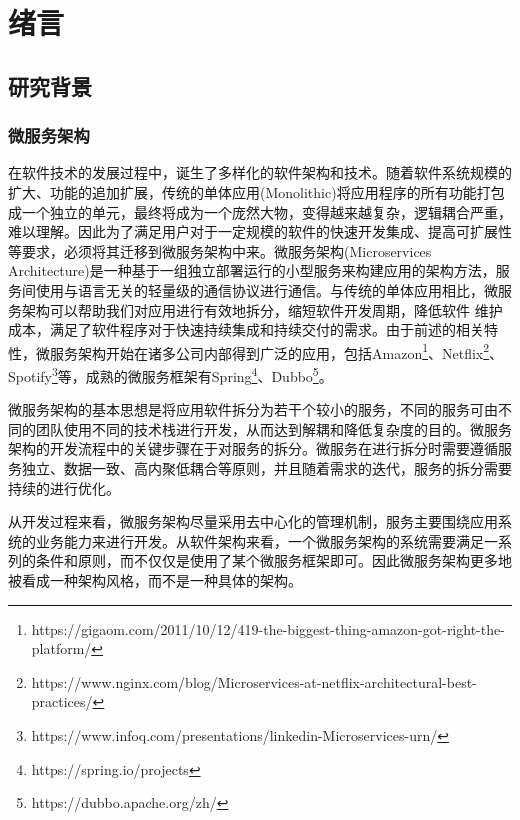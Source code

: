 \documentclass[macfonts,master]{njuthesis}
\begin{document}
\chapter{绪言}\label{chapter_introduction}

\section{研究背景}
\subsection{微服务架构}
在软件技术的发展过程中，诞生了多样化的软件架构和技术。随着软件系统规模的扩大、功能的追加扩展，传统的单体应用(Monolithic)将应用程序的所有功能打包成一个独立的单元，最终将成为一个庞然大物，变得越来越复杂，逻辑耦合严重，难以理解。因此为了满足用户对于一定规模的软件的快速开发集成、提高可扩展性等要求，必须将其迁移到微服务架构中来\cite{bucchiarone2018monolithic,taibi2017processes,al2018comparative,马晓星2019软件开发方法发展回顾与展望}。微服务架构(Microservices Architecture)是一种基于一组独立部署运行的小型服务来构建应用的架构方法，服务间使用与语言无关的轻量级的通信协议进行通信\cite{Microservices,dragoni2017microservices}。与传统的单体应用相比，微服务架构可以帮助我们对应用进行有效地拆分，缩短软件开发周期，降低软件 维护成本，满足了软件程序对于快速持续集成和持续交付的需求\cite{balalaie2016microservices,taibi2018architectural}。由于前述的相关特性，微服务架构开始在诸多公司内部得到广泛的应用，包括Amazon\footnote{https://gigaom.com/2011/10/12/419-the-biggest-thing-amazon-got-right-the-platform/}、Netflix\footnote{https://www.nginx.com/blog/Microservices-at-netflix-architectural-best-practices/}、Spotify\footnote{https://www.infoq.com/presentations/linkedin-Microservices-urn/}等，成熟的微服务框架有Spring\footnote{https://spring.io/projects}、Dubbo\footnote{https://dubbo.apache.org/zh/}。

微服务架构的基本思想是将应用软件拆分为若干个较小的服务，不同的服务可由不同的团队使用不同的技术栈进行开发，从而达到解耦和降低复杂度的目的\cite{Microservices}。微服务架构的开发流程中的关键步骤在于对服务的拆分。微服务在进行拆分时需要遵循服务独立、数据一致、高内聚低耦合等原则，并且随着需求的迭代，服务的拆分需要持续的进行优化。

从开发过程来看，微服务架构尽量采用去中心化的管理机制，服务主要围绕应用系统的业务能力来进行开发。从软件架构来看，一个微服务架构的系统需要满足一系列的条件和原则，而不仅仅是使用了某个微服务框架即可。因此微服务架构更多地被看成一种架构风格，而不是一种具体的架构。
\end{document}
